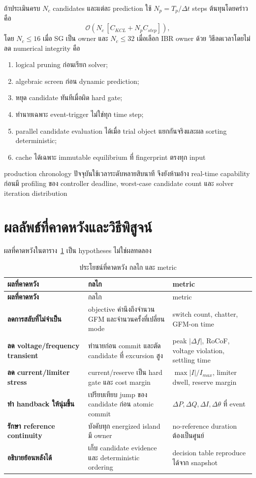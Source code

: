 \documentclass[12pt,a4paper]{article}
\begin{document}
ถ้าประเมินครบ $N_c$ candidates และแต่ละ prediction ใช้ $N_p=T_p/\Delta t$ steps ต้นทุนโดยคร่าวคือ
\begin{equation}
\mathcal O\!\left(N_c\,[C_{KCL}+N_pC_{step}]\right),
\end{equation}
โดย $N_c\le16$ เมื่อ SG เป็น owner และ $N_c\le32$ เมื่อเลือก IBR owner ด้วย วิธีลดเวลาโดยไม่ลด
numerical integrity คือ
\begin{enumerate}
  \item logical pruning ก่อนเรียก solver;
  \item algebraic screen ก่อน dynamic prediction;
  \item หยุด candidate ทันทีเมื่อผิด hard gate;
  \item ทำนายเฉพาะ event-trigger ไม่ใช่ทุก time step;
  \item parallel candidate evaluation ได้เมื่อ trial object แยกกันจริงและผล sorting deterministic;
  \item cache ได้เฉพาะ immutable equilibrium ที่ fingerprint ตรงทุก input
\end{enumerate}
production chronology ปัจจุบันใช้เวลาระดับหลายสิบนาที จึงยังห้ามอ้าง real-time capability
ก่อนมี profiling ของ controller deadline, worst-case candidate count และ solver iteration distribution

\section{ผลลัพธ์ที่คาดหวังและวิธีพิสูจน์}

ผลที่คาดหวังในตาราง~\ref{tab:expected} เป็น hypotheses ไม่ใช่ผลทดลอง

\begin{longtable}{>{\bfseries}p{}p{}p{}}
\caption{ประโยชน์ที่คาดหวัง กลไก และ metric}\label{tab:expected}\\
\toprule
ผลที่คาดหวัง & กลไก & metric \\
\midrule\endfirsthead
\toprule ผลที่คาดหวัง & กลไก & metric \\
\midrule\endhead
ลดการสลับที่ไม่จำเป็น & objective คำนึงถึงจำนวน GFM และจำนวนครั้งที่เปลี่ยน mode & switch count, chatter, GFM-on time \\
ลด voltage/frequency transient & ทำนายก่อน commit และตัด candidate ที่ excursion สูง & peak $|\Delta f|$, RoCoF, voltage violation, settling time \\
ลด current/limiter stress & current/reserve เป็น hard gate และ cost margin & $\max |I|/I_{max}$, limiter dwell, reserve margin \\
ทำ handback ให้นุ่มขึ้น & เปรียบเทียบ jump ของ candidate ก่อน atomic commit & $\Delta P,\Delta Q,\Delta I,\Delta\theta$ ที่ event \\
รักษา reference continuity & บังคับทุก energized island มี owner & no-reference duration ต้องเป็นศูนย์ \\
อธิบายย้อนหลังได้ & เก็บ candidate evidence และ deterministic ordering & decision table reproduce ได้จาก snapshot \\
\bottomrule
\end{longtable}
\end{document}
